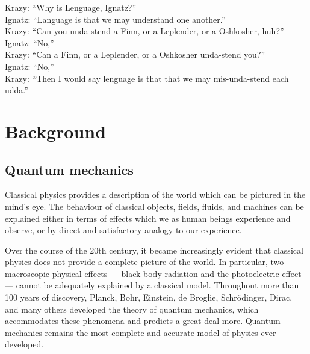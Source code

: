 
\begin{savequote}[140mm] 
Krazy: ``Why is Lenguage, Ignatz?''\\
Ignatz: ``Language is that we may understand one another.''\\
Krazy:  ``Can you unda-stend a Finn, or a Leplender, or a Oshkosher, huh?''\\
Ignatz: ``No,''\\
Krazy: ``Can a Finn, or a Leplender, or a Oshkosher unda-stend you?''\\
Ignatz: ``No,''\\
Krazy: ``Then I would say lenguage is that that we may mis-unda-stend each udda.''
\end{savequote}


\chapter{Background}
\label{chap:background}

\section{Quantum mechanics}
\label{sec:triangles}
Classical physics provides a description of the world which can be pictured in the mind's eye. The behaviour of classical objects, fields, fluids, and machines can be explained either in terms of effects which we as human beings experience and observe, or by direct and satisfactory analogy to our experience. 

Over the course of the 20th century, it became increasingly evident that classical physics does not provide a complete picture of the world. In particular, two macroscopic physical effects --- black body radiation and the photoelectric effect --- cannot be adequately explained by a classical model.  Throughout more than 100 years of discovery, Planck, Bohr, Einstein, de Broglie, Schr\"odinger, Dirac, and many others developed the theory of quantum mechanics, which accommodates these phenomena and predicts a great deal more. Quantum mechanics remains the most complete and accurate model of physics ever developed.

